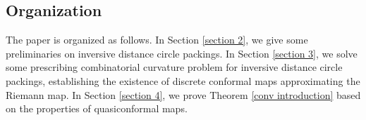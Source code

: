 \documentclass[12pt]{amsart}
\newtheorem{conj}[theorem]{Conjecture}
\begin{document}





\subsection{Organization} The paper is organized as follows.
In Section \ref{section 2}, we give some preliminaries on inversive distance circle packings.
In Section \ref{section 3}, we solve some prescribing combinatorial curvature problem for inversive distance circle packings, establishing the existence of discrete conformal maps approximating the Riemann map. 
In Section \ref{section 4},  we prove Theorem \ref{conv introduction} based on the properties of quasiconformal maps.
\end{document}
